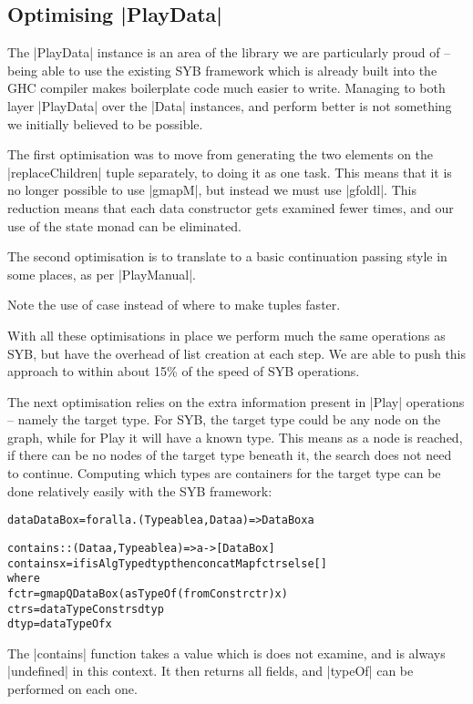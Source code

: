 \documentclass[preprint]{sigplanconf}
\newenvironment{code}{\begin{alltt}\small}{\end{alltt}}
\begin{document}
\subsection{Optimising |PlayData|}
\label{sec:optimise_playdata}

The |PlayData| instance is an area of the library we are particularly proud of -- being able to use the existing SYB framework which is already built into the GHC compiler makes boilerplate code much easier to write. Managing to both layer |PlayData| over the |Data| instances, and perform better is not something we initially believed to be possible.

The first optimisation was to move from generating the two elements on the |replaceChildren| tuple separately, to doing it as one task. This means that it is no longer possible to use |gmapM|, but instead we must use |gfoldl|. This reduction means that each data constructor gets examined fewer times, and our use of the state monad can be eliminated.

The second optimisation is to translate to a basic continuation passing style in some places, as per |PlayManual|.

Note the use of case instead of where to make tuples faster.

With all these optimisations in place we perform much the same operations as SYB, but have the overhead of list creation at each step. We are able to push this approach to within about 15\% of the speed of SYB operations.

The next optimisation relies on the extra information present in |Play| operations -- namely the target type. For SYB, the target type could be any node on the graph, while for Play it will have a known type. This means as a node is reached, if there can be no nodes of the target type beneath it, the search does not need to continue. Computing which types are containers for the target type can be done relatively easily with the SYB framework:

\begin{code}
data DataBox = forall a . (Typeable a, Data a) => DataBox a

contains :: (Data a, Typeable a) => a -> [DataBox]
contains x = if isAlgType dtyp then concatMap f ctrs else []
    where
        f ctr = gmapQ DataBox (asTypeOf (fromConstr ctr) x)
        ctrs = dataTypeConstrs dtyp
        dtyp = dataTypeOf x
\end{code}

The |contains| function takes a value which is does not examine, and is always |undefined| in this context. It then returns all fields, and |typeOf| can be performed on each one.
\end{document}
